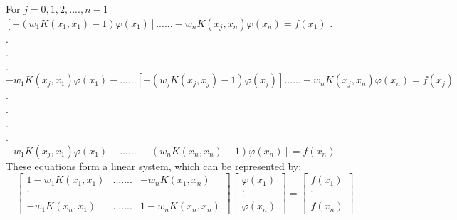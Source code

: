 \documentclass[../document.tex]{subfiles}
\begin{document}
	For $j=0,1,2,....,n-1$\newline
	$
	\left[ -(w_1 K(x_1,x_1) - 1)\varphi(x_1)  \right] 
	......  -w_n K(x_j,x_n) \varphi(x_n) = f(x_1)
	$
	.\\.\\.\\.\\
	$
	-w_1 K(x_j,x_1)\varphi(x_1) -...... 
	\left[ -(w_j K(x_j,x_j) - 1)\varphi(x_j)  \right] 
	......  -w_n K(x_j,x_n) \varphi(x_n) = f(x_j)
	$
	.\\.\\.\\.\\
	$
	-w_1 K(x_j,x_1)\varphi(x_1) -...... 
	\left[ -(w_n K(x_n,x_n) - 1)\varphi(x_n)  \right]  = f(x_n)
	$
	\\These equations form a linear system, which can be represented by:
	$$
	\begin{bmatrix}
		1 -w_1 K(x_1,x_1) &   ....... & -w_n K(x_1,x_n) \\
		.\\.\\
		-w_1 K(x_n,x_1)   &   ....... & 1-w_n K(x_n,x_n) 
	\end{bmatrix}
	\begin{bmatrix}
		\varphi(x_1) \\
		.\\.\\
		\varphi(x_n) 
	\end{bmatrix}
	=
	\begin{bmatrix}
		f(x_1) \\
		.\\.\\
		f(x_n)
	\end{bmatrix}
	$$
	
\end{document}
